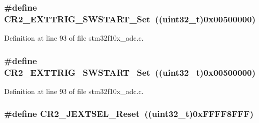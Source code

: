 \subsubsection[{\texorpdfstring{C\+R2\+\_\+\+E\+X\+T\+T\+R\+I\+G\+\_\+\+S\+W\+S\+T\+A\+R\+T\+\_\+\+Set}{CR2_EXTTRIG_SWSTART_Set}}]{\setlength{\rightskip}{0pt plus 5cm}\#define C\+R2\+\_\+\+E\+X\+T\+T\+R\+I\+G\+\_\+\+S\+W\+S\+T\+A\+R\+T\+\_\+\+Set~(({\bf uint32\+\_\+t})0x00500000)}\hypertarget{group___a_d_c___private___defines_gad9bed838631a650428d2318694a66094}{}\label{group___a_d_c___private___defines_gad9bed838631a650428d2318694a66094}


Definition at line 93 of file stm32f10x\+\_\+adc.\+c.

\subsubsection[{\texorpdfstring{C\+R2\+\_\+\+E\+X\+T\+T\+R\+I\+G\+\_\+\+S\+W\+S\+T\+A\+R\+T\+\_\+\+Set}{CR2_EXTTRIG_SWSTART_Set}}]{\setlength{\rightskip}{0pt plus 5cm}\#define C\+R2\+\_\+\+E\+X\+T\+T\+R\+I\+G\+\_\+\+S\+W\+S\+T\+A\+R\+T\+\_\+\+Set~(({\bf uint32\+\_\+t})0x00500000)}\hypertarget{group___a_d_c___private___defines_gad9bed838631a650428d2318694a66094}{}\label{group___a_d_c___private___defines_gad9bed838631a650428d2318694a66094}


Definition at line 93 of file stm32f10x\+\_\+adc.\+c.

\subsubsection[{\texorpdfstring{C\+R2\+\_\+\+J\+E\+X\+T\+S\+E\+L\+\_\+\+Reset}{CR2_JEXTSEL_Reset}}]{\setlength{\rightskip}{0pt plus 5cm}\#define C\+R2\+\_\+\+J\+E\+X\+T\+S\+E\+L\+\_\+\+Reset~(({\bf uint32\+\_\+t})0x\+F\+F\+F\+F8\+F\+F\+F)}\hypertarget{group___a_d_c___private___defines_gafa78c11893aa39ad2c0117414ae1704d}{}\label{group___a_d_c___private___defines_gafa78c11893aa39ad2c0117414ae1704d}



